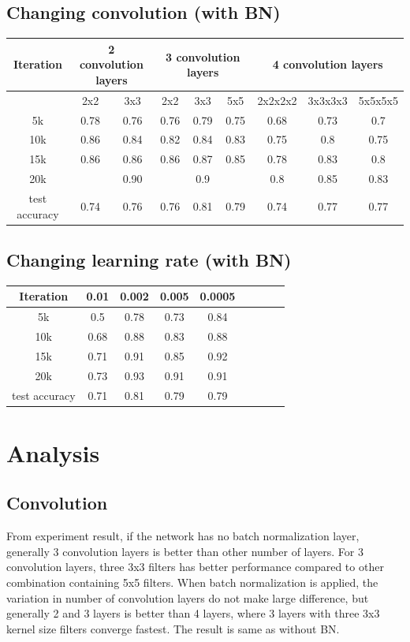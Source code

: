\documentclass[journal,onecolumn, 12pt]{IEEEtran}
\begin{document}
\subsection{Changing convolution (with BN)}
\begin{tabular}{*9c}
  \hline
  Iteration & \multicolumn{2}{c}{2 convolution layers} & \multicolumn{3}{c}{3 convolution layers} & \multicolumn{3}{c}{4 convolution layers}\\
  \hline
  {} & 2x2 & 3x3 & 2x2 & 3x3 & 5x5 & 2x2x2x2 & 3x3x3x3 & 5x5x5x5\\
  \hline
  5k & 0.78 & 0.76 & 0.76 & 0.79 & 0.75 & 0.68 & 0.73 & 0.7\\
  10k & 0.86 & 0.84 & 0.82 & 0.84 & 0.83 & 0.75 & 0.8 & 0.75\\
  15k & 0.86 & 0.86 & 0.86 & 0.87 & 0.85 & 0.78 & 0.83 & 0.8\\
  20k & {} & 0.90 & {} & 0.9 & {} & 0.8 & 0.85 & 0.83\\
  test accuracy & 0.74 & 0.76 & 0.76 & 0.81 & 0.79 & 0.74 & 0.77 & 0.77\\
  \hline
\end{tabular}

\subsection{Changing learning rate (with BN)}
\begin{tabular}{*9c}
  \hline
  Iteration & 0.01 & 0.002 & 0.005 & 0.0005 \\
  \hline
  5k & 0.5 & 0.78   & 0.73 & 0.84\\
  10k & 0.68 & 0.88 & 0.83 & 0.88 \\
  15k & 0.71 & 0.91 & 0.85 & 0.92 \\
  20k & 0.73 & 0.93 & 0.91 & 0.91 \\
  test accuracy & 0.71 & 0.81 & 0.79 & 0.79 \\
  \hline
\end{tabular}


\section{Analysis}
\subsection{Convolution}
From experiment result, if the network has no batch normalization layer, generally 3 convolution layers is better than other number of layers. For 3 convolution layers, three 3x3 filters has better performance compared to other combination containing 5x5 filters. When batch normalization is applied, the variation in number of convolution layers do not make large difference, but generally 2 and 3 layers is better than 4 layers, where 3 layers with three 3x3 kernel size filters converge fastest. The result is same as without BN. 
\end{document}
